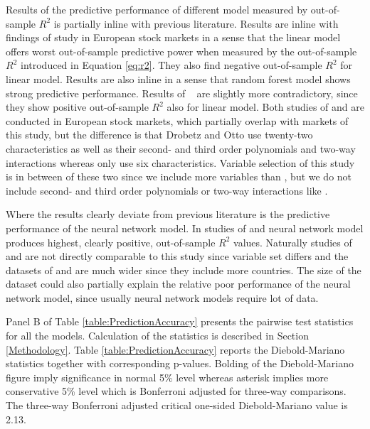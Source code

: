 \documentclass[12pt]{article}
\begin{document}
Results of the predictive performance of different model measured by out-of-sample $R^2$ is partially inline with previous literature. Results are inline with findings of \citet{Drobetz} study in European stock markets in a sense that the linear model offers worst out-of-sample predictive power when measured by the out-of-sample $R^2$ introduced in Equation \ref{eq:r2}. They also find negative out-of-sample $R^2$ for linear model. Results are also inline in a sense that random forest model shows strong predictive performance. Results of \ \citet{Fieberg} are slightly more contradictory, since they show positive out-of-sample $R^2$ also for linear model\footnotemark. Both studies of \citeauthor{Drobetz} and \citeauthor{Fieberg} are conducted in European stock markets, which partially overlap with markets of this study, but the difference is that Drobetz and Otto use twenty-two characteristics as well as their  second- and third order polynomials and two-way interactions whereas \citeauthor{Fieberg} only use six characteristics. Variable selection of this study is in between of these two since we include more variables than \citeauthor{Fieberg}, but we do not include second- and third order polynomials or two-way interactions like \citeauthor{Drobetz}. \par


Where the results clearly deviate from previous literature is the predictive performance of the neural network model. In studies of \citet{Drobetz} and \citet{Fieberg} neural network model produces highest, clearly positive, out-of-sample $R^2$ values. Naturally studies of \citeauthor{Drobetz} and \citeauthor{Fieberg} are not directly comparable to this study since variable set differs and the datasets of  \citeauthor{Drobetz} and \citeauthor{Fieberg} are much wider since they include more countries. The size of the dataset could also partially explain the relative poor performance of the neural network model, since usually neural network models require lot of data. \par

Panel B of Table \ref{table:PredictionAccuracy} presents the pairwise \citet{Diebold1995} test statistics for all the models. Calculation of the statistics is described in Section \ref{Methodology}. Table \ref{table:PredictionAccuracy} reports the Diebold-Mariano statistics together with corresponding p-values. Bolding of the Diebold-Mariano figure imply significance in normal 5\% level whereas asterisk implies more conservative 5\% level which is Bonferroni adjusted for three-way comparisons. The three-way Bonferroni adjusted critical one-sided Diebold-Mariano value is 2.13. \par
\end{document}
